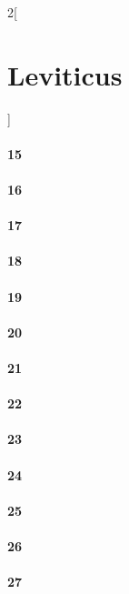 \documentclass{book}
\begin{document}
\begin{multicols}{2}[\part{Leviticus}]
\subsection*{15}
\subsection*{16}
\subsection*{17}
\subsection*{18}
\subsection*{19}
\subsection*{20}
\subsection*{21}
\subsection*{22}
\subsection*{23}
\subsection*{24}
\subsection*{25}
\subsection*{26}
\subsection*{27}
\end{multicols}
\end{document}
